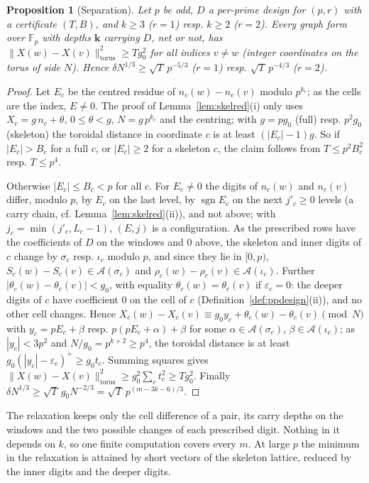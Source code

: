 \documentclass[11pt]{amsart}
\newtheorem{proposition}[theorem]{Proposition}
\theoremstyle{definition}
\theoremstyle{plain}
\newcommand{\F}{\mathbb{F}}
\DeclareMathOperator{\sgn}{sgn}
\begin{document}
\begin{proposition}[Separation]\label{prop:ppsep}
Let $p$ be odd, $D$ a per-prime design for $(p,r)$ with a certificate $(T,B)$, and $k\ge3$ ($r=1$) resp. $k\ge2$ ($r=2$). Every graph form over $\F_p$ with depths $\mathbf k$ carrying $D$, net or not, has $\|X(w)-X(v)\|^2_{\mathrm{torus}}\ge Tg_0^2$ for all indices $v\ne w$ (integer coordinates on the torus of side $N$). Hence $\delta N^{1/3}\ge\sqrt T\,p^{-5/3}$ ($r=1$) resp. $\sqrt T\,p^{-4/3}$ ($r=2$).
\end{proposition}

\begin{proof}
Let $E_c$ be the centred residue of $n_c(w)-n_c(v)$ modulo $p^{k_c}$; as the cells are the index, $E\ne0$. The proof of Lemma~\ref{lem:skelred}(i) only uses $X_c=g\,n_c+\theta$, $0\le\theta<g$, $N=g\,p^{k_c}$ and the centring; with $g=pg_0$ (full) resp. $p^2g_0$ (skeleton) the toroidal distance in coordinate $c$ is at least $(|E_c|-1)g$. So if $|E_c|>B_c$ for a full $c$, or $|E_c|\ge2$ for a skeleton $c$, the claim follows from $T\le p^2B_c^2$ resp. $T\le p^4$.

Otherwise $|E_c|\le B_c<p$ for all $c$. For $E_c\ne0$ the digits of $n_c(w)$ and $n_c(v)$ differ, modulo $p$, by $E_c$ on the last level, by $\sgn E_c$ on the next $j'_c\ge0$ levels (a carry chain, cf. Lemma~\ref{lem:skelred}(ii)), and not above; with $j_c=\min(j'_c,L_c-1)$, $(E,j)$ is a configuration. As the prescribed rows have the coefficients of $D$ on the windows and $0$ above, the skeleton and inner digits of $c$ change by $\sigma_c$ resp. $\iota_c$ modulo $p$, and since they lie in $[0,p)$, $S_c(w)-S_c(v)\in\mathcal A(\sigma_c)$ and $\rho_c(w)-\rho_c(v)\in\mathcal A(\iota_c)$. Further $|\theta_c(w)-\theta_c(v)|<g_0$, with equality $\theta_c(w)=\theta_c(v)$ if $\varepsilon_c=0$: the deeper digits of $c$ have coefficient $0$ on the cell of $c$ (Definition~\ref{def:ppdesign}(ii)), and no other cell changes. Hence $X_c(w)-X_c(v)\equiv g_0y_c+\theta_c(w)-\theta_c(v)\pmod N$ with $y_c=pE_c+\beta$ resp. $p(pE_c+\alpha)+\beta$ for some $\alpha\in\mathcal A(\sigma_c)$, $\beta\in\mathcal A(\iota_c)$; as $|y_c|<3p^2$ and $N/g_0=p^{k+2}\ge p^4$, the toroidal distance is at least $g_0(|y_c|-\varepsilon_c)^+\ge g_0t_c$. Summing squares gives $\|X(w)-X(v)\|^2_{\mathrm{torus}}\ge g_0^2\sum_ct_c^2\ge Tg_0^2$. Finally $\delta N^{1/3}\ge\sqrt T\,g_0N^{-2/3}=\sqrt T\,p^{(m-3k-6)/3}$.
\end{proof}

The relaxation keeps only the cell difference of a pair, its carry depths on the windows and the two possible changes of each prescribed digit. Nothing in it depends on $k$, so one finite computation covers every $m$. At large $p$ the minimum in the relaxation is attained by short vectors of the skeleton lattice, reduced by the inner digits and the deeper digits.
\end{document}
